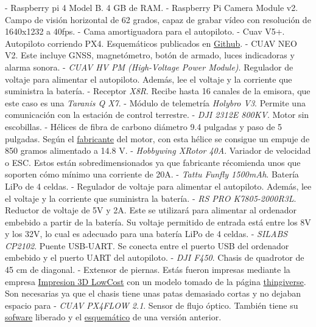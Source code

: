 - Raspberry pi 4 Model B. 4 GB de RAM. 
- Raspberry Pi Camera Module v2. Campo de visión horizontal de 62 grados, capaz de grabar vídeo con resolución de 1640x1232 a 40fps.
- Cama amortiguadora para el autopiloto.
- Cuav V5+. Autopiloto corriendo PX4. Esquemáticos publicados en \href{https://github.com/ArduPilot/Schematics/tree/master/CUAV/V5_Autopilot/V5\%2B}{Github}.
- CUAV NEO V2. Este incluye GNSS, magnetómetro, botón de armado, luces indicadoras y alarma sonora.
- \textit{CUAV HV PM (High-Voltage Power Module)}. Regulador de voltaje para alimentar el autopiloto. Además, lee el voltaje y la corriente que suministra la batería. 
- Receptor \textit{X8R}. Recibe hasta 16 canales de la emisora, que este caso es una \textit{Taranis Q X7}. 
- Módulo de telemetría \textit{Holybro V3}. Permite una comunicación con la estación de control terrestre.
- \textit{DJI 2312E 800KV}. Motor sin escobillas.
- Hélices de fibra de carbono diámetro 9.4 pulgadas y paso de 5 pulgadas. Según el \href{https://www.dji.com/e305/spec}{fabricante} del motor, con esta hélice se consigue un empuje de 850 gramos alimentado a 14.8 V.
- \textit{Hobbywing XRotor 40A}. Variador de velocidad o ESC. Estos están sobredimensionados ya que fabricante récomienda unos que soporten cómo mínimo una corriente de 20A.
- \textit{Tattu Funfly 1500mAh}. Batería LiPo de 4 celdas.
- Regulador de voltaje para alimentar el autopiloto. Además, lee el voltaje y la corriente que suministra la batería. 
- \textit{RS PRO K7805-2000R3L}. Reductor de voltaje de 5V y 2A. Este se utilizará para alimentar al ordenador embebido a partir de la batería. Su voltaje permitido de entrada está entre los 8V y los 32V, lo cual es adecuado para una batería LiPo de 4 celdas. 
- \textit{SILABS CP2102}. Puente USB-UART. Se conecta entre el puerto USB del ordenador embebido y el puerto UART del autopiloto.
- \textit{DJI F450}. Chasis de quadrotor de 45 cm de diagonal. 
- Extensor de piernas. Estás fueron impresas mediante la empresa \href{https://impresion3dlowcost.es/}{Impresion 3D LowCost} con un modelo tomado de la página \href{https://www.thingiverse.com/thing:915639}{thingiverse}. Son necesarias ya que el chasis tiene unas patas demasiado cortas y no dejaban espacio para  
- \textit{CUAV PX4FLOW 2.1}. Sensor de flujo óptico. También tiene su \href{https://github.com/PX4/PX4-Flow}{sofware} liberado y el \href{https://github.com/pixhawk/Hardware/tree/master/FLOWv1}{esquemático} de una versión anterior.



